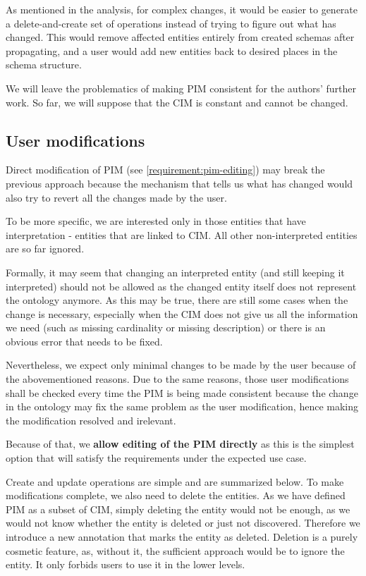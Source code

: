 As mentioned in the analysis, for complex changes, it would be easier to generate a delete-and-create set of operations instead of trying to figure out what has changed. This would remove affected entities entirely from created schemas after propagating, and a user would add new entities back to desired places in the schema structure.

\medskip

We will leave the problematics of making PIM consistent for the authors' further work. So far, we will suppose that the CIM is constant and cannot be changed.

\subsection{User modifications}\label{section:pim-user-modifications}

Direct modification of PIM (see \autoref{requirement:pim-editing}) may break the previous approach because the mechanism that tells us what has changed would also try to revert all the changes made by the user.

To be more specific, we are interested only in those entities that have interpretation - entities that are linked to CIM. All other non-interpreted entities are so far ignored.

Formally, it may seem that changing an interpreted entity (and still keeping it interpreted) should not be allowed as the changed entity itself does not represent the ontology anymore. As this may be true, there are still some cases when the change is necessary, especially when the CIM does not give us all the information we need (such as missing cardinality or missing description) or there is an obvious error that needs to be fixed.

\medskip

Nevertheless, we expect only minimal changes to be made by the user because of the abovementioned reasons. Due to the same reasons, those user modifications shall be checked every time the PIM is being made consistent because the change in the ontology may fix the same problem as the user modification, hence making the modification resolved and irelevant.

Because of that, we \textbf{allow editing of the PIM directly} as this is the simplest option that will satisfy the requirements under the expected use case.

Create and update operations are simple and are summarized below. To make modifications complete, we also need to delete the entities. As we have defined PIM as a subset of CIM, simply deleting the entity would not be enough, as we would not know whether the entity is deleted or just not discovered. Therefore we introduce a new annotation that marks the entity as deleted. Deletion is a purely cosmetic feature, as, without it, the sufficient approach would be to ignore the entity. It only forbids users to use it in the lower levels.

